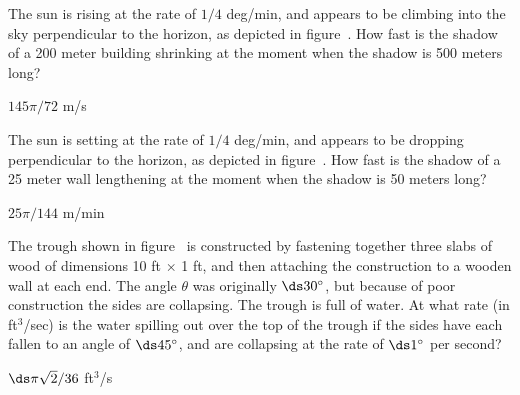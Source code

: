 \begin{exercises}
\begin{exercise}
The sun is rising at the rate of $1/4$ deg/min, and appears to be
climbing into the sky perpendicular to the
horizon, as depicted in figure~.
How fast is the shadow of a 200 meter building
shrinking at the moment when the shadow is 500 meters long? 
\begin{answer} $145\pi/72$ m/s
\end{answer}\end{exercise}

\begin{exercise} The sun is setting at the rate of $1/4$ deg/min, and appears
to be dropping perpendicular to the horizon, as depicted in
figure~. How fast is the shadow of a 25
meter wall lengthening at the moment when the shadow is 50 meters long?
\begin{answer} $25\pi/144$ m/min
\end{answer}\end{exercise}




\begin{exercise}
The trough shown in figure~
is constructed by fastening together three
slabs of wood of dimensions 10 ft $\times$ 1 ft, and then attaching the
construction to a wooden wall at each end.  The angle $\theta$ was
originally $\ds 30^\circ$, but because of poor construction the sides are
collapsing.  The trough is full of water.  At what rate (in ft${}^3$/sec) 
is 
the water spilling out over the top of
the trough if the sides have each fallen to an angle of $\ds 45^\circ$, and are
collapsing at the rate of $\ds 1^\circ$ per second?
\begin{answer} $\ds \pi\sqrt2/36$ ft$^3$/s
\end{answer}\end{exercise}


\end{exercises}
